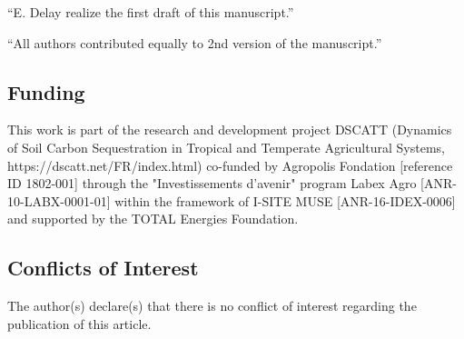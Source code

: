\documentclass{article}
\begin{document}
``E. Delay realize the first draft of this manuscript.''

``All authors contributed equally to 2nd version of the manuscript.''

\subsection*{Funding}

This work is part of the research and development project DSCATT (Dynamics of Soil Carbon Sequestration in Tropical and Temperate Agricultural Systems, https://dscatt.net/FR/index.html) co-funded by Agropolis Fondation [reference ID 1802-001] through the "Investissements d'avenir" program Labex Agro [ANR-10-LABX-0001-01] within the framework of I-SITE MUSE [ANR-16-IDEX-0006] and supported by the TOTAL Energies Foundation.

\subsection*{Conflicts of Interest}
The author(s) declare(s) that there is no conflict of interest regarding the publication of this article.





\end{document}

